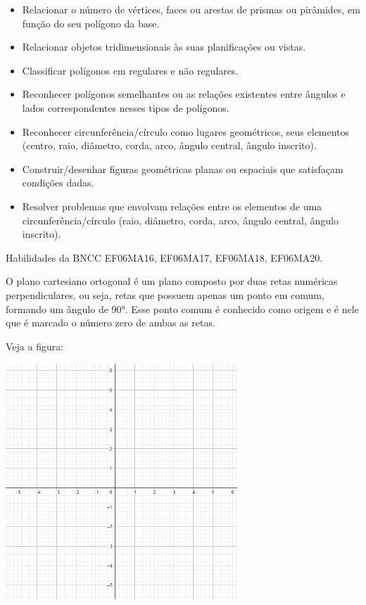 \begin{itemize}
\item
  Relacionar o número de vértices, faces ou arestas de prismas ou
  pirâmides, em função do seu polígono da base.
\item
  Relacionar objetos tridimensionais às suas planificações ou vistas.
\item
  Classificar polígonos em regulares e não regulares.
\item
  Reconhecer polígonos semelhantes ou as relações existentes entre
  ângulos e lados correspondentes nesses tipos de polígonos.
\item
  Reconhecer circunferência/círculo como lugares geométricos, seus
  elementos (centro, raio, diâmetro, corda, arco, ângulo central, ângulo
  inscrito).
\item
  Construir/desenhar figuras geométricas planas ou espaciais que
  satisfaçam condições dadas.
\item
  Resolver problemas que envolvam relações entre os elementos de uma
  circunferência/círculo (raio, diâmetro, corda, arco, ângulo central,
  ângulo inscrito).
\end{itemize}

Habilidades da BNCC EF06MA16, EF06MA17, EF06MA18, EF06MA20.

O plano cartesiano ortogonal é um plano composto por duas retas
numéricas perpendiculares, ou seja, retas que possuem apenas um ponto em
comum, formando um ângulo de 90°. Esse ponto comum é conhecido como
origem e é nele que é marcado o número zero de ambas as retas.

Veja a figura:

\includegraphics[width=3.42575in,height=3.5in]{./imgSAEB_6_MAT/media/image39.png}

